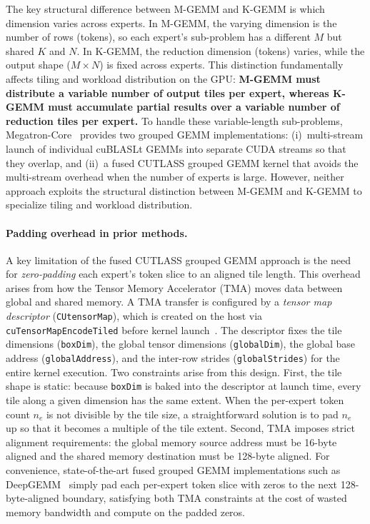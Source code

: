 \documentclass[11pt,a4paper]{article}
\theoremstyle{definition}
\begin{document}
The key structural difference between M-GEMM and K-GEMM is which dimension
varies across experts. In M-GEMM, the varying dimension is the number of
rows (tokens), so each expert's sub-problem has a different $M$ but shared
$K$ and $N$. In K-GEMM, the reduction dimension (tokens) varies, while the
output shape ($M \times N$) is fixed across experts. This distinction
fundamentally affects tiling and workload distribution on the GPU:
\textbf{M-GEMM must distribute a variable number of output tiles per expert, whereas
K-GEMM must accumulate partial results over a variable number of reduction tiles
per expert.}
To handle these variable-length sub-problems,
Megatron-Core~\cite{nvidia2026megatronmoe} provides two grouped GEMM
implementations: (i)~multi-stream launch of individual cuBLASLt GEMMs into
separate CUDA streams so that they overlap, and (ii)~a fused CUTLASS grouped
GEMM kernel that avoids the multi-stream overhead when the number of experts
is large. However, neither approach exploits the structural
distinction between M-GEMM and K-GEMM to specialize tiling and workload
distribution.

\paragraph{Padding overhead in prior methods.}
A key limitation of the fused CUTLASS grouped GEMM approach is the need for
\emph{zero-padding} each expert's token slice to an aligned tile length.
This overhead arises from how the Tensor Memory Accelerator
(TMA) moves data between global and shared memory. A TMA transfer is
configured by a \emph{tensor map descriptor}
(\texttt{CUtensorMap}), which is created on the host via
\texttt{cuTensorMapEncodeTiled} before kernel
launch~\cite{nvidia_cuda_programming_guide,nvidia_cuda_toolkit}. The descriptor
fixes the tile dimensions (\texttt{boxDim}), the global tensor
dimensions (\texttt{globalDim}), the global base address
(\texttt{globalAddress}), and the inter-row strides
(\texttt{globalStrides}) for the entire kernel execution.
Two constraints arise from this design.
First, the tile shape is static: because
\texttt{boxDim} is baked into the descriptor at launch time, every
tile along a given dimension has the same extent. When the per-expert
token count $n_e$ is not divisible by the tile size, a straightforward solution is to pad $n_e$ up so that it becomes a
multiple of the tile extent.
Second, TMA imposes strict alignment requirements: the global memory
source address must be 16-byte aligned and the shared memory destination must be
128-byte aligned.
For convenience, state-of-the-art fused grouped GEMM implementations
such as DeepGEMM~\cite{deepgemm2025} simply pad each per-expert
token slice with zeros to the next 128-byte-aligned boundary,
satisfying both TMA constraints at the cost of wasted memory
bandwidth and compute on the padded zeros.
\end{document}
